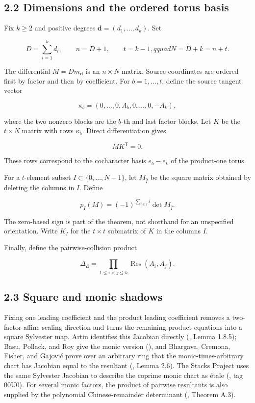 \documentclass[
  11pt,
  a4paper,
]{article}
\begin{document}
\subsection{2.2 Dimensions and the ordered torus
basis}\label{dimensions-and-the-ordered-torus-basis}

Fix \(k\ge2\) and positive degrees \(\mathbf d=(d_1,\ldots,d_k)\). Set

\[
 D=\sum_{i=1}^kd_i,\qquad n=D+1,
 \qquad t=k-1,qquad N=D+k=n+t.
\]

The differential \(M=Dm_{\mathbf d}\) is an \(n\times N\) matrix. Source
coordinates are ordered first by factor and then by coefficient. For
\(b=1,\ldots,t\), define the source tangent vector

\[
 \kappa_b=(0,\ldots,0,A_b,0,\ldots,0,-A_k),
\]

where the two nonzero blocks are the \(b\)-th and last factor blocks.
Let \(K\) be the \(t\times N\) matrix with rows \(\kappa_b\). Direct
differentiation gives

\[
 M K^{\mathsf T}=0.
\]

These rows correspond to the cocharacter basis \(e_b-e_k\) of the
product-one torus.

For a \(t\)-element subset \(I\subset\{0,\ldots,N-1\}\), let
\(M_{\widehat I}\) be the square matrix obtained by deleting the columns
in \(I\). Define

\[
 p_I(M)=(-1)^{\sum_{i\in I}i}\det M_{\widehat I}.
\]

The zero-based sign is part of the theorem, not shorthand for an
unspecified orientation. Write \(K_I\) for the \(t\times t\) submatrix
of \(K\) in the columns \(I\).

Finally, define the pairwise-collision product

\[
 \Delta_{\mathbf d}=\prod_{1\le i<j\le k}
 \operatorname{Res}(A_i,A_j).
\]

\subsection{2.3 Square and monic
shadows}\label{square-and-monic-shadows}

Fixing one leading coefficient and the product leading coefficient
removes a two-factor affine scaling direction and turns the remaining
product equations into a square Sylvester map. Artin identifies this
Jacobian directly (, Lemma
1.8.5); Basu, Pollack, and Roy give the monic version
(), and
Bhargava, Cremona, Fisher, and Gajović prove over an arbitrary ring that
the monic-times-arbitrary chart has Jacobian equal to the resultant
(,
Lemma 2.6). The Stacks Project uses the same Sylvester Jacobian to
describe the coprime monic chart as étale
(, tag
00U0). For several monic factors, the product of pairwise resultants is
also supplied by the polynomial Chinese-remainder determinant
(, Theorem
A.3).
\end{document}
